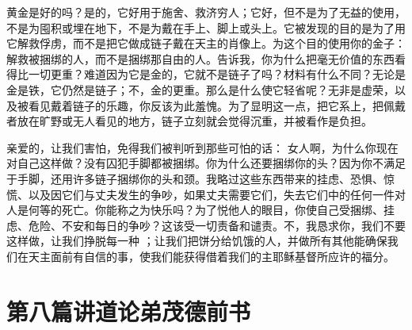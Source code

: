 黄金是好的吗？是的，它好用于施舍、救济穷人；它好，但不是为了无益的使用，不是为囤积或埋在地下，不是为戴在手上、脚上或头上。它被发现的目的是为了用它解救俘虏，而不是把它做成链子戴在天主的肖像上。为这个目的使用你的金子：解救被捆绑的人，而不是捆绑那自由的人。告诉我，你为什么把毫无价值的东西看得比一切更重？难道因为它是金的，它就不是链子了吗？材料有什么不同？无论是金是铁，它仍然是链子；不，金的更重。那么是什么使它轻省呢？无非是虚荣，以及被看见戴着链子的乐趣，你反该为此羞愧。为了显明这一点，把它系上，把佩戴者放在旷野或无人看见的地方，链子立刻就会觉得沉重，并被看作是负担。\par

亲爱的，让我们害怕，免得我们被判听到那些可怕的话：  女人啊，为什么你现在对自己这样做？没有囚犯手脚都被捆绑。你为什么还要捆绑你的头？因为你不满足于手脚，还用许多链子捆绑你的头和颈。我略过这些东西带来的挂虑、恐惧、惊慌、以及因它们与丈夫发生的争吵，如果丈夫需要它们，失去它们中的任何一件对人是何等的死亡。你能称之为快乐吗？为了悦他人的眼目，你使自己受捆绑、挂虑、危险、不安和每日的争吵？这该受一切责备和谴责。不，我恳求你，我们不要这样做，让我们挣脱每一种 ；让我们把饼分给饥饿的人，并做所有其他能确保我们在天主面前有自信的事，使我们能获得借着我们的主耶稣基督所应许的福分。\par



\section{第八篇讲道论弟茂德前书}

\par

\par

